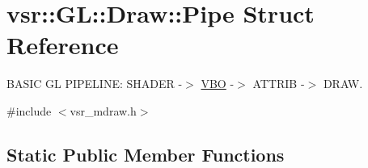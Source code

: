 \hypertarget{structvsr_1_1_g_l_1_1_draw_1_1_pipe}{\section{vsr\-:\-:G\-L\-:\-:Draw\-:\-:Pipe Struct Reference}
\label{structvsr_1_1_g_l_1_1_draw_1_1_pipe}
}


B\-A\-S\-I\-C G\-L P\-I\-P\-E\-L\-I\-N\-E\-: S\-H\-A\-D\-E\-R -\/$>$ \hyperlink{classvsr_1_1_v_b_o}{V\-B\-O} -\/$>$ A\-T\-T\-R\-I\-B -\/$>$ D\-R\-A\-W.  




{\ttfamily \#include $<$vsr\-\_\-mdraw.\-h$>$}

\subsection*{Static Public Member Functions}
